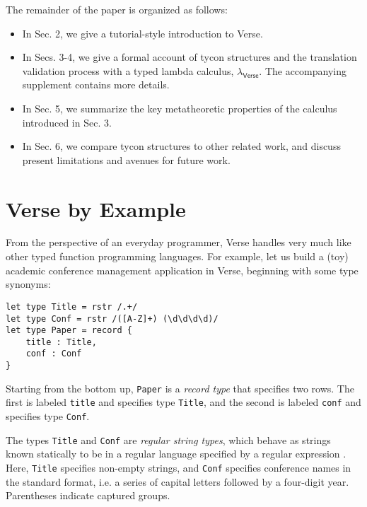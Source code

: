 \documentclass[preprint]{sigplanconf}
\newcommand{\Verse}{{\textsf{\small Verse}}}
\newcommand{\liv}[1]{\lstinline{#1}}
\begin{document}
The remainder of the paper is organized as follows:\vspace{-3px}
\begin{itemize}[noitemsep]
\item In Sec. 2, we give a tutorial-style introduction to \Verse. %
\item In Secs. 3-4, we give a formal account of tycon structures and the translation validation process with a typed lambda calculus, $\lambda_\textsf{Verse}$. The accompanying supplement contains more details.
\item In Sec. 5, we summarize the key metatheoretic properties of the calculus introduced in Sec. 3. 
\item In Sec. 6, we compare tycon structures to other related work, and discuss present limitations and avenues for future work.
\end{itemize}

\section{\textsf{Verse} by Example}
From the perspective of an everyday programmer, {\Verse} handles very much like other typed function programming languages. For example, let us build a (toy) academic conference management application in \Verse, beginning with some type synonyms: 

\vspace{-3px}\begin{lstlisting}
let type Title = rstr /.+/
let type Conf = rstr /([A-Z]+) (\d\d\d\d)/
let type Paper = record {
    title : Title,
    conf : Conf
}
\end{lstlisting}\vspace{-3px}
Starting from the bottom up, \liv{Paper} is a \emph{record type} that specifies two rows. The first is labeled \liv{title} and specifies type \liv{Title}, and the second is labeled \liv{conf} and specifies type \liv{Conf}. 

The types \liv{Title} and \liv{Conf} are \emph{regular string types}, which behave as strings known statically to be in a regular language specified by a regular expression \cite{sanitation-psp14}. Here, \liv{Title} specifies non-empty strings, and \liv{Conf} specifies conference names in the standard format, i.e. a series of capital letters followed by a four-digit year. Parentheses indicate captured groups.
\end{document}
